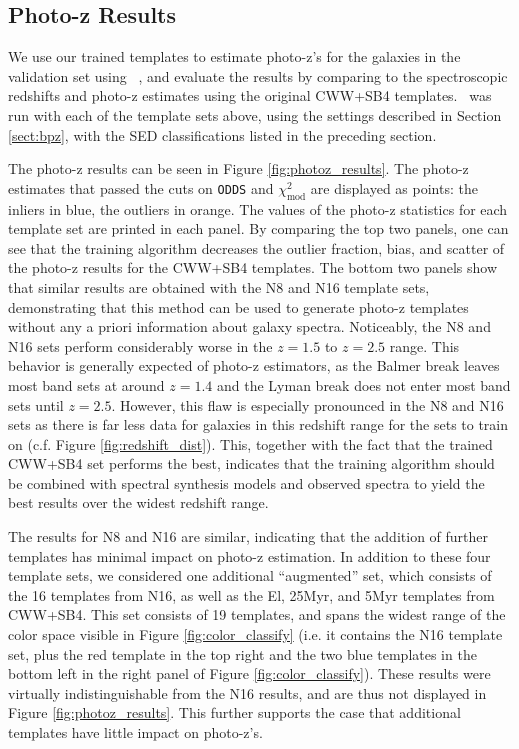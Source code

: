\subsection{Photo-z Results}
\label{sect:photoz_results}

We use our trained templates to estimate photo-z's for the galaxies in the validation set using \bpz\ \citep{Benitez2000a}, and evaluate the results by comparing to the spectroscopic redshifts and photo-z estimates using the original CWW+SB4 templates. 
\bpz\ was run with each of the template sets above, using the settings described in Section \ref{sect:bpz}, with the SED classifications listed in the preceding section. 

The photo-z results can be seen in Figure \ref{fig:photoz_results}.
The photo-z estimates that passed the cuts on \texttt{ODDS} and $\chi_\text{mod}^2$ are displayed as points: the inliers in blue, the outliers in orange.
The values of the photo-z statistics for each template set are printed in each panel.
By comparing the top two panels, one can see that the training algorithm decreases the outlier fraction, bias, and scatter of the photo-z results for the CWW+SB4 templates.
The bottom two panels show that similar results are obtained with the N8 and N16 template sets, demonstrating that this method can be used to generate photo-z templates without any a priori information about galaxy spectra.
Noticeably, the N8 and N16 sets perform considerably worse in the $z = 1.5$ to $z = 2.5$ range.
This behavior is generally expected of photo-z estimators, as the Balmer break leaves most band sets at around $z=1.4$ and the Lyman break does not enter most band sets until $z=2.5$.
However, this flaw is especially pronounced in the N8 and N16 sets as there is far less data for galaxies in this redshift range for the sets to train on (c.f. Figure \ref{fig:redshift_dist}).
This, together with the fact that the trained CWW+SB4 set performs the best, indicates that the training algorithm should be combined with spectral synthesis models and observed spectra to yield the best results over the widest redshift range.

The results for N8 and N16 are similar, indicating that the addition of further templates has minimal impact on photo-z estimation. 
In addition to these four template sets, we considered one additional ``augmented'' set, which consists of the 16 templates from N16, as well as the El, 25Myr, and 5Myr templates from CWW+SB4.
This set consists of 19 templates, and spans the widest range of the color space visible in Figure \ref{fig:color_classify} (i.e. it contains the N16 template set, plus the red template in the top right and the two blue templates in the bottom left in the right panel of Figure \ref{fig:color_classify}). 
These results were virtually indistinguishable from the N16 results, and are thus not displayed in Figure \ref{fig:photoz_results}.
This further supports the case that additional templates have little impact on photo-z's.

